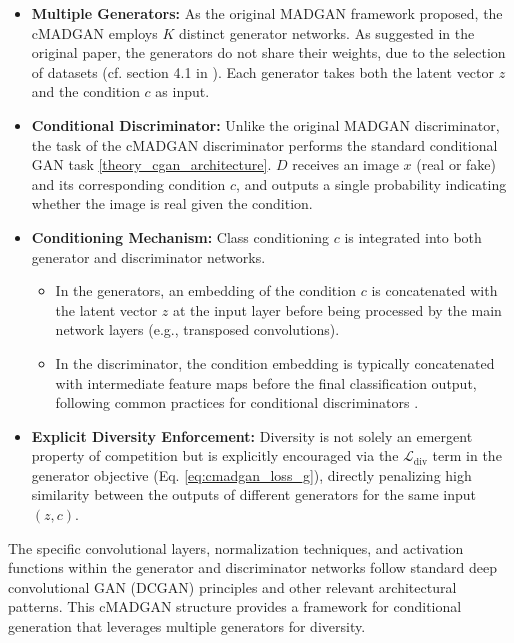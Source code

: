 \begin{itemize}
    \item \textbf{Multiple Generators:}
    As the original MADGAN framework proposed, the cMADGAN employs $K$ distinct generator networks. As suggested in the original paper, the generators do not share their weights, due to the selection of datasets (cf. section 4.1 in \cite{ghosh2018madgan}). Each generator takes both the latent vector $z$ and the condition $c$ as input.
    \item \textbf{Conditional Discriminator:}
    Unlike the original MADGAN discriminator, the task of the cMADGAN discriminator performs the standard conditional GAN task \ref{theory_cgan_architecture}. $D$ receives an image $x$ (real or fake) and its corresponding condition $c$, and outputs a single probability indicating whether the image is real given the condition.
    \item \textbf{Conditioning Mechanism:} Class conditioning $c$ is integrated into both generator and discriminator networks.
        \begin{itemize}
            \item In the generators, an embedding of the condition $c$ is concatenated with the latent vector $z$ at the input layer before being processed by the main network layers (e.g., transposed convolutions).
            \item In the discriminator, the condition embedding is typically concatenated with intermediate feature maps before the final classification output, following common practices for conditional discriminators \cite{mirza2014conditionalgenerativeadversarialnets}.
        \end{itemize}
    \item \textbf{Explicit Diversity Enforcement:} Diversity is not solely an emergent property of competition but is explicitly encouraged via the $\mathcal{L}_{\text{div}}$ term in the generator objective (Eq. \ref{eq:cmadgan_loss_g}), directly penalizing high similarity between the outputs of different generators for the same input $(z, c)$.
\end{itemize}

The specific convolutional layers, normalization techniques, and activation functions within the generator and discriminator networks follow standard deep convolutional GAN (DCGAN) \cite{Radford2015DCGAN} principles and other relevant architectural patterns. This cMADGAN structure provides a framework for conditional generation that leverages multiple generators for diversity.



